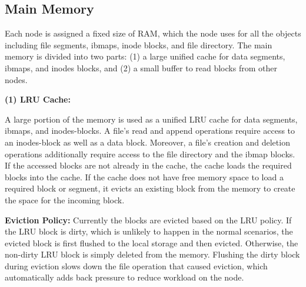 \documentclass[]{article}
\newcommand{\subtopic}[1]{\vspace{1.5pt} \noindent \textbf{#1}}
\begin{document}
\subsection{Main Memory}

Each node is assigned a fixed size of RAM, which the node uses 
for all the objects including file segments, ibmaps, inode blocks, and
file directory. The main memory is divided into two parts: (1) a large
unified cache for data segments, ibmaps, and inodes blocks, and (2) a small
buffer to read blocks from other nodes.


\subtopic{(1) LRU Cache:} 

A large portion of the memory is used as a unified LRU cache for data segments,
ibmaps, and inodes-blocks.  A file's read and append operations require access
to an inodes-block as well as a data block. Moreover, a file's creation and
deletion operations additionally require access to the file directory and the
ibmap blocks. If the accessed blocks are not already in the cache, the cache
loads the required blocks into the cache.  If the cache does not have free
memory space to load a required block or segment, it evicts an existing block
from the memory to create the space for the incoming block. 

\subtopic{Eviction Policy:} Currently the blocks are evicted based on the LRU
policy.  If the LRU block is dirty, which is unlikely to happen in the normal
scenarios, the evicted block is first flushed to the local storage and then
evicted. Otherwise, the non-dirty LRU block is simply deleted from the memory.
Flushing the dirty block during eviction  slows down the file operation that
caused eviction, which automatically adds back pressure to reduce workload on
the node.


%
%
%


%
%
%
%
\end{document}
